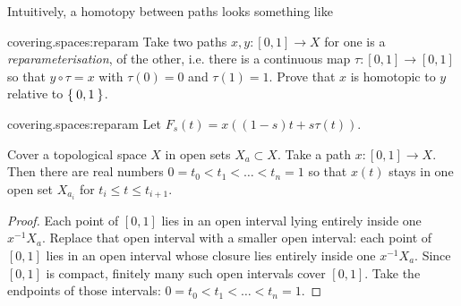 Intuitively, a homotopy between paths looks something like
\begin{center}

\end{center}
\begin{problem}{covering.spaces:reparam}
Take two paths \(x, y \colon [0,1] \to X\) for one is a \emph{reparameterisation}, of the other, i.e. there is a continuous map \(\tau \colon [0,1] \to [0,1]\) so that \(y \circ \tau = x\) with \(\tau(0)=0\) and \(\tau(1)=1\).
Prove that \(x\) is homotopic to \(y\) relative to \(\Set{0,1}\).
\end{problem}
\begin{answer}{covering.spaces:reparam}
Let \(F_s(t)=x((1-s)t+s\tau(t))\).
\end{answer}
\begin{lemma}\label{lemma:pick.times}
Cover a topological space \(X\) in open sets \(X_a \subset X\).
Take a path \(x \colon [0,1] \to X\).
Then there are real numbers \(0=t_0 < t_1 < \dots < t_n=1\) so that \(x(t)\) stays in one open set \(X_{a_i}\) for \(t_i \le t \le t_{i+1}\).
\end{lemma}
\begin{proof}
Each point of \([0,1]\) lies in an open interval lying entirely inside one \(x^{-1}X_a\).
Replace that open interval with a smaller open interval: each point of \([0,1]\) lies in an open interval whose closure lies entirely inside one \(x^{-1}X_a\).
Since \([0,1]\) is compact, finitely many such open intervals cover \([0,1]\).
Take the endpoints of those intervals: \(0=t_0 < t_1 < \dots < t_n=1\).
\end{proof}


